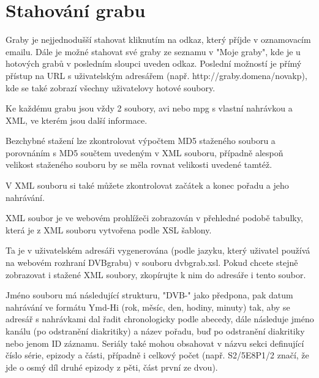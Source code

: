 \vspace{10pt}

\section{Stahování grabu}

\vspace{10pt}

Graby je nejjednodušší stahovat kliknutím na odkaz, který příjde v oznamovacím emailu. Dále je možné stahovat své graby ze seznamu v "Moje graby", kde je u hotových grabů v posledním sloupci uveden odkaz. Poslední možností je přímý přístup na URL s uživatelským adresářem (např. http://graby.domena/novakp), kde se také zobrazí všechny uživatelovy hotové soubory.

\vspace{10pt}

Ke každému grabu jsou vždy 2 soubory, avi nebo mpg s vlastní nahrávkou a XML, ve kterém jsou další informace.

\vspace{10pt}

Bezchybné stažení lze zkontrolovat výpočtem MD5 staženého souboru a porovnáním s MD5 součtem uvedeným v XML souboru, případně alespoň velikost staženého souboru by se měla rovnat velikosti uvedené tamtéž.

\vspace{10pt}

V XML souboru si také můžete zkontrolovat začátek a konec pořadu a jeho nahrávání.

\vspace{10pt}

XML soubor je ve webovém prohlížeči zobrazován v přehledné podobě tabulky, která je z XML souboru vytvořena podle XSL šablony.

Ta je v uživatelském adresáři vygenerována (podle jazyku, který uživatel používá na webovém rozhraní DVBgrabu) v souboru dvbgrab.xsl. Pokud chcete stejně zobrazovat i stažené XML soubory, zkopírujte k nim do adresáře i tento soubor.

\vspace{10pt}

Jméno souboru má následující strukturu, "DVB-" jako předpona, pak datum nahrávání ve formátu Ymd-Hi (rok, měsíc, den, hodiny, minuty) tak, aby se adresář s nahrávkami dal řadit chronologicky podle abecedy, dále následuje jméno kanálu (po odstranění diakritiky) a název pořadu, buď po odstranění diakritiky nebo jenom ID záznamu. Seriály také mohou obsahovat v názvu sekci definující číslo série, epizody a části, případně i celkový počet (např. S2/5E8P1/2 značí, že jde o osmý díl druhé epizody z pěti, část první ze dvou).

